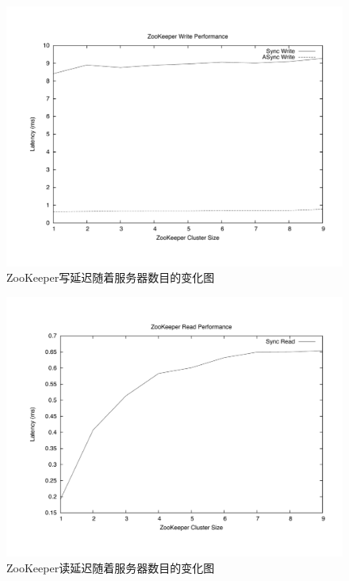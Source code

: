 \begin{figure}[h!]
\centering
\includegraphics[width=4.5in]{../figures/zklatency.pdf}
\caption{ZooKeeper写延迟随着服务器数目的变化图}
\label{fig:zklatency}
\end{figure}

\begin{figure}[h!]
\centering
\includegraphics[width=4.5in]{../figures/zkrlatency.pdf}
\caption{ZooKeeper读延迟随着服务器数目的变化图}
\label{fig:zkrlatency}
\end{figure}

